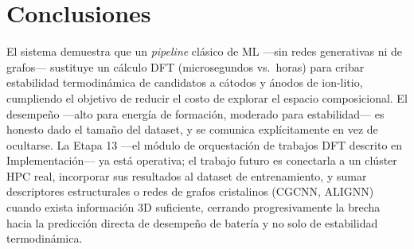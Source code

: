 \section{Conclusiones}

El sistema demuestra que un \textit{pipeline} clásico de ML —sin redes
generativas ni de grafos— sustituye un cálculo DFT (microsegundos vs.\
horas) para cribar estabilidad termodinámica de candidatos a cátodos y
ánodos de ion-litio, cumpliendo el objetivo de reducir el costo de explorar
el espacio composicional. El desempeño —alto para energía de formación,
moderado para estabilidad— es honesto dado el tamaño del dataset, y se
comunica explícitamente en vez de ocultarse. La Etapa 13 —el módulo de orquestación de
trabajos DFT descrito en Implementación— ya está operativa; el trabajo
futuro es conectarla a un clúster HPC real, incorporar sus resultados al
dataset de entrenamiento, y sumar descriptores estructurales o redes de
grafos cristalinos (CGCNN, ALIGNN) cuando exista información 3D suficiente,
cerrando progresivamente la brecha hacia la predicción directa de
desempeño de batería y no solo de estabilidad termodinámica.